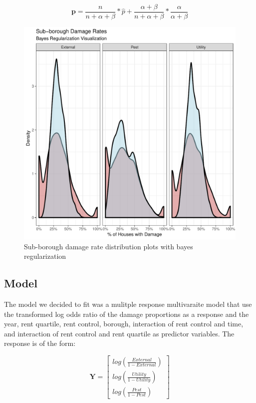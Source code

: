 \documentclass[11pt]{asaproc}\usepackage[]{graphicx}\usepackage[]{color}
\makeatletter
\def\maxwidth{ %
  \ifdim\Gin@nat@width>\linewidth
    \linewidth
  \else
    \Gin@nat@width
  \fi
}
\newenvironment{knitrout}{}{} %
\makeatother
\begin{document}
\[
\mathbf{p} = \frac{n}{n+\alpha+\beta}*\hat{p}+\frac{\alpha+\beta}{n+\alpha+\beta}*\frac{\alpha}{\alpha+\beta}
\]

\begin{figure}
\begin{center}
\begin{knitrout}
\color{fgcolor}
\includegraphics[width=\maxwidth]{figure/fig3-1} 

\end{knitrout}
\end{center}
\caption{Sub-borough damage rate distribution plots with bayes regularization}
\label{fig:three}
\end{figure}

\subsection{Model}
The model we decided to fit was a mulitple response multivaraite model that use the transformed log odds ratio of the damage proportions as a response and the year, rent quartile, rent control, borough, interaction of rent control and time, and interaction of rent control and rent quartile as predictor variables. The response is of the form:

\[
\mathbf{Y} = 
\left[
\begin{matrix} 
log\left(\frac{External}{1-External}\right)\\
log\left(\frac{Utility}{1-Utility}\right) \\
log\left(\frac{Pest}{1-Pest}\right) 
\end{matrix}
\right]
\]
\end{document}
